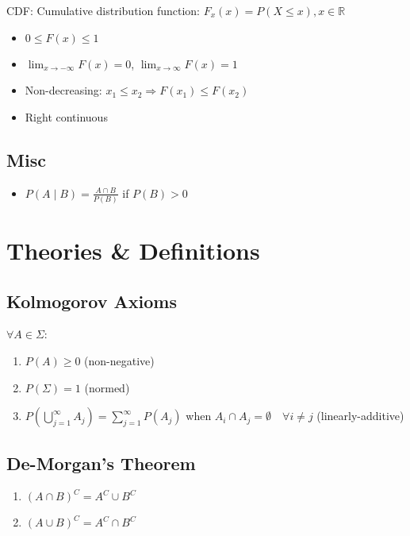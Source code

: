 \documentclass[12pt]{article}
\newcommand{\real}[0]{\mathbb{R}}
\newcommand{\pp}[1]{\left(#1\right)}
\begin{document}
CDF: Cumulative distribution function: $F_x(x) = P(X \le x), x \in \real$

\begin{itemize}
	\item $0 \le F(x) \le 1$
	\item $\lim_{x \rightarrow -\infty} F(x) = 0$, $\lim_{x \rightarrow \infty} F(x) = 1$
	\item Non-decreasing: $x_1 \le x_2 \Rightarrow F(x_1) \le F(x_2)$
	\item Right continuous
\end{itemize}

\subsection{Misc}

\begin{itemize}
	\item $P(A \mid B) = \frac{A \cap B}{P(B)}$ if $P(B) > 0$
\end{itemize}

\section{Theories \& Definitions}

\subsection{Kolmogorov Axioms}

$\forall A \in \Sigma$:

\begin{enumerate}
	\item $P(A) \ge 0$ (non-negative)
	\item $P(\Sigma) = 1$ (normed)
	\item $P \pp{\bigcup_{j = 1}^\infty A_j} = \sum_{j = 1}^\infty P(A_j)$ when $A_i \cap A_j = \emptyset \quad \forall i \ne j$ (linearly-additive)
\end{enumerate}

\subsection{De-Morgan's Theorem}

\begin{enumerate}
	\item $(A \cap B)^C = A^C \cup B^C$ 
	\item $(A \cup B)^C = A^C \cap B^C$
\end{enumerate}
\end{document}
